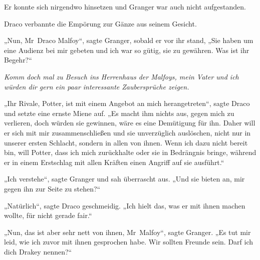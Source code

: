 Er konnte sich nirgendwo hinsetzen und Granger war auch nicht aufgestanden.

Draco verbannte die Empörung zur Gänze aus seinem Gesicht.

„Nun, Mr~Draco Malfoy“, sagte Granger, sobald er vor ihr stand,
„Sie haben um eine Audienz bei mir gebeten und ich war so gütig, sie zu gewähren. Was ist ihr Begehr?“

\emph{Komm doch mal zu Besuch ins Herrenhaus der Malfoys, mein Vater und ich würden dir gern ein paar interessante Zaubersprüche zeigen.}

„Ihr Rivale, Potter, ist mit einem Angebot an mich herangetreten“, sagte Draco und setzte eine ernste Miene auf.
„Es macht ihm nichts aus, gegen mich zu verlieren, doch würden sie gewinnen, wäre es eine Demütigung für ihn. Daher will er sich mit mir zusammenschließen und sie unverzüglich auslöschen, nicht nur in unserer ersten Schlacht, sondern in allen von ihnen. Wenn ich dazu nicht bereit bin, will Potter, dass ich mich zurückhalte oder sie in Bedrängnis bringe, während er in einem Erstschlag mit allen Kräften einen Angriff auf sie ausführt.“

„Ich verstehe“, sagte Granger und sah überrascht aus.
„Und sie bieten an, mir gegen ihn zur Seite zu stehen?“

„Natürlich“, sagte Draco geschmeidig.
„Ich hielt das, was er mit ihnen machen wollte, für nicht gerade fair.“

„Nun, das ist aber sehr nett von ihnen, Mr~Malfoy“, sagte Granger.
„Es tut mir leid, wie ich zuvor mit ihnen gesprochen habe. Wir sollten Freunde sein. Darf ich dich Drakey nennen?“

